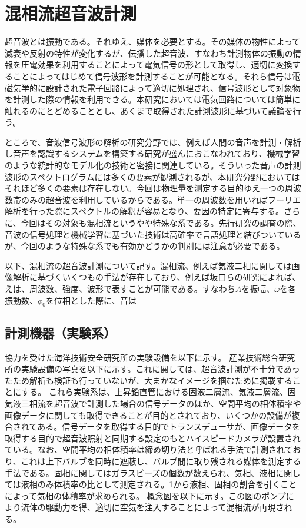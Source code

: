 \documentclass[uplatex]{suribt}
\begin{document}
\chapter{混相流超音波計測}\label{experimental settings}
超音波とは振動である。それゆえ、媒体を必要とする。その媒体の物性によって減衰や反射の特性が変化するが、伝播した超音波、すなわち計測物体の振動の情報を圧電効果を利用することによって電気信号の形として取得し、適切に変換することによってはじめて信号波形を計測することが可能となる。それら信号は電磁気学的に設計された電子回路によって適切に処理され、信号波形として対象物を計測した際の情報を利用できる。本研究においては電気回路については簡単に触れるのにとどめることとし、あくまで取得された計測波形に基づいて議論を行う。\par
ところで、音波信号波形の解析の研究分野では、例えば人間の音声を計測・解析し音声を認識するシステムを構築する研究が盛んにおこなわれており、機械学習のような統計的なモデル化の技術と密接に関連している。そういった音声の計測波形のスペクトログラムには多くの要素が観測されるが、本研究分野においてはそれほど多くの要素は存在しない。今回は物理量を測定する目的ゆえ一つの周波数帯のみの超音波を利用しているからである。単一の周波数を用いればフーリエ解析を行った際にスペクトルの解釈が容易となり、要因の特定に寄与する。さらに、今回はその対象も混相流というやや特殊な系である。先行研究の調査の際、音波の信号処理と機械学習に基づいた技術は高確率で言語処理と結びついているが、今回のような特殊な系でも有効かどうかの判別には注意が必要である。\par
以下、混相流の超音波計測について記す。混相流、例えば気液二相に関しては画像解析に基づくいくつもの手法が存在しており、例えば坂口ら\cite{sakaguchibubble}の研究によれば、えは、周波数、強度、波形で表すことが可能である。すなわち$A$を振幅、$\omega$を各振動数、$\phi_0$を位相とした際に、音は 
\section{計測機器（実験系）}
協力を受けた海洋技術安全研究所の実験設備を以下に示す。
産業技術総合研究所の実験設備の写真を以下に示す。これに関しては、超音波計測が不十分であったため解析も検証も行っていないが、大まかなイメージを掴むために掲載することにする。
これら実験系は、上昇鉛直管における固液二層流、気液二層流、固気液三相流を超音波で計測した場合の信号データのほか、空間平均の相体積率や画像データに関しても取得できることが目的とされており、いくつかの設備が複合されてある。信号データを取得する目的でトランスデューサが、画像データを取得する目的で超音波照射と同期する設定のもとハイスピードカメラが設置されている。なお、空間平均の相体積率は締め切り法と呼ばれる手法で計測されており、これは上下バルブを同時に遮蔽し、バルブ間に取り残される媒体を測定する手法である。固相に関してはガラスビーズの個数が数えられ、気相、液相に関しては液相のみ体積率の比として測定される。1から液相、固相の割合を引くことによって気相の体積率が求められる。
概念図を以下に示す。この図のポンプにより流体の駆動力を得、適切に空気を注入することによって混相流が再現される。
\end{document}
